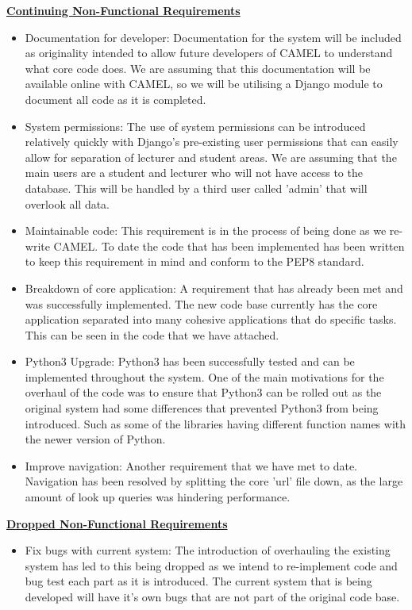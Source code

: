 	\underline{\textbf{Continuing Non-Functional Requirements}}
	\begin{itemize}
		
		\item Documentation for developer: Documentation for the system will be included as originality intended to allow future developers of CAMEL to understand what core code does. We are assuming that this documentation will be available online with CAMEL, so we will be utilising a Django module to document all code as it is completed.
		
		\item System permissions: The use of system permissions can be introduced relatively quickly with Django's pre-existing user permissions that can easily allow for separation of lecturer and student areas. We are assuming that the main users are a student and lecturer who will not have access to the database. This will be handled by a third user called 'admin' that will overlook all data. 
		
		\item Maintainable code: This requirement is in the process of being done as we re-write CAMEL. To date the code that has been implemented has been written to keep this requirement in mind and conform to the PEP8 standard.
		
		\item Breakdown of core application: A requirement that has already been met and was successfully implemented. The new code base currently has the core application separated into many cohesive applications that do specific tasks. This can be seen in the code that we have attached.
		
		\item Python3 Upgrade: Python3 has been successfully tested and can be implemented throughout the system. One of the main motivations for the overhaul of the code was to ensure that Python3 can be rolled out as the original system had some differences that prevented Python3 from being introduced. Such as some of the libraries having different function names with the newer version of Python.    
		
		\item Improve navigation: Another requirement that we have met to date. Navigation has been resolved by splitting the core 'url' file down, as the large amount of look up queries was hindering performance.
	\end{itemize}
	
	\underline{\textbf{Dropped Non-Functional Requirements}}
	\begin{itemize}
		\item Fix bugs with current system: The introduction of overhauling the existing system has led to this being dropped as we intend to re-implement code and bug test each part as it is introduced. The current system that is being developed will have it's own bugs that are not part of the original code base.   
	\end{itemize}
	